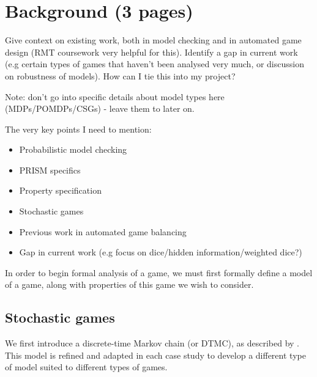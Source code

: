 
\chapter{Background (3 pages)}

Give context on existing work, both in model checking and in automated game design (RMT coursework very helpful for this). Identify a gap in current work (e.g certain types of games that haven't been analysed very much, or discussion on robustness of models). How can I tie this into my project?

Note: don't go into specific details about model types here (MDPs/POMDPs/CSGs) - leave them to later on.

The very key points I need to mention:

\begin{itemize}
    \item Probabilistic model checking
    \item PRISM specifics
    \item Property specification
    \item Stochastic games
    \item Previous work in automated game balancing
    \item Gap in current work (e.g focus on dice/hidden information/weighted dice?)
\end{itemize}

In order to begin formal analysis of a game, we must first formally define a model of a game, along with properties of this game we wish to consider.

\section{Stochastic games}
\label{back:stoc_game}

We first introduce a discrete-time Markov chain (or DTMC), as described by \cite{kwiatkowska_stochastic_2007}. This model is refined and adapted in each case study to develop a different type of model suited to different types of games.

